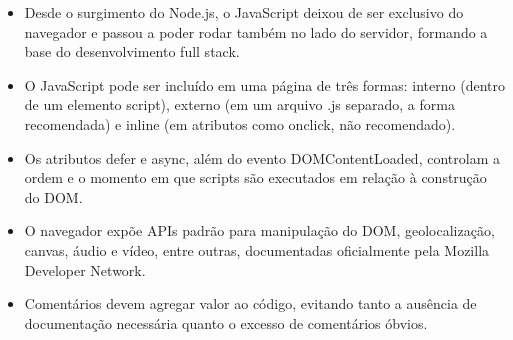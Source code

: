 \begin{itemize}
  \item Desde o surgimento do Node.js, o JavaScript deixou de ser exclusivo do navegador e passou a poder rodar também no lado do servidor, formando a base do desenvolvimento full stack.
\end{itemize}

\begin{itemize}
  \item O JavaScript pode ser incluído em uma página de três formas: interno (dentro de um elemento script), externo (em um arquivo .js separado, a forma recomendada) e inline (em atributos como onclick, não recomendado).
\end{itemize}

\begin{itemize}
  \item Os atributos defer e async, além do evento DOMContentLoaded, controlam a ordem e o momento em que scripts são executados em relação à construção do DOM.
\end{itemize}

\begin{itemize}
  \item O navegador expõe APIs padrão para manipulação do DOM, geolocalização, canvas, áudio e vídeo, entre outras, documentadas oficialmente pela Mozilla Developer Network.
\end{itemize}

\begin{itemize}
  \item Comentários devem agregar valor ao código, evitando tanto a ausência de documentação necessária quanto o excesso de comentários óbvios.
\end{itemize}

